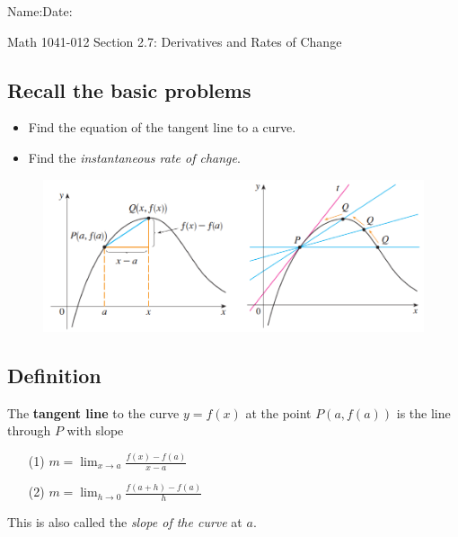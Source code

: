 \documentclass[10pt]{book}
\theoremstyle{definition}
\begin{document}
\begin{flushleft}
Name:\underline{\hspace{13cm}}Date:\underline{\hspace{2cm}}
\end{flushleft}
\begin{center}
{\Large Math 1041-012 \hspace{0.5cm} Section 2.7: Derivatives and Rates of Change}
\end{center}
\begin{tcolorbox}
\subsection*{Recall the basic problems}
\begin{itemize}
    \item Find the equation of the tangent line to a curve.
    \item Find the \textit{instantaneous rate of change}.
\end{itemize}
\end{tcolorbox}
\begin{figure}[h!]
    \centering
    \includegraphics[scale=0.7]{fig1.png}
\end{figure}
\begin{tcolorbox}
\subsection*{Definition} The \textbf{tangent line} to the curve $y=f(x)$ at the point $P(a,f(a))$ is the line through $P$ with slope
\begin{itemize}
    \item[(1)] $\displaystyle
m=\lim_{x\rightarrow a}\frac{f(x)-f(a)}{x-a}
$\vspace{0.5cm}
\item[(2)]$m=\displaystyle\lim_{h\rightarrow 0}\frac{f(a+h)-f(a)}{h}$
\end{itemize}
This is also called the \textit{slope of the curve} at $a$.
\end{tcolorbox}
\end{document}
